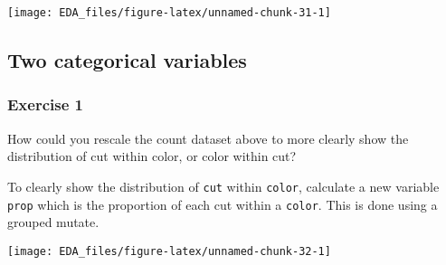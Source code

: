 \documentclass[]{book}
\newenvironment{Shaded}{\begin{snugshade}}{\end{snugshade}}
\newcommand{\CommentTok}[1]{\textcolor[rgb]{0.56,0.35,0.01}{\textit{#1}}}
\newcommand{\DataTypeTok}[1]{\textcolor[rgb]{0.13,0.29,0.53}{#1}}
\newcommand{\DecValTok}[1]{\textcolor[rgb]{0.00,0.00,0.81}{#1}}
\newcommand{\KeywordTok}[1]{\textcolor[rgb]{0.13,0.29,0.53}{\textbf{#1}}}
\newcommand{\NormalTok}[1]{#1}
\newcommand{\OperatorTok}[1]{\textcolor[rgb]{0.81,0.36,0.00}{\textbf{#1}}}
\newcommand{\StringTok}[1]{\textcolor[rgb]{0.31,0.60,0.02}{#1}}
\theoremstyle{plain}
\theoremstyle{remark}
\theoremstyle{definition}
\theoremstyle{definition}
\theoremstyle{definition}
\theoremstyle{remark}
\begin{document}
\begin{center}\texttt{[image: EDA\_files/figure-latex/unnamed-chunk-31-1]} \end{center}

\hypertarget{two-categorical-variables}{%
\subsection{Two categorical variables}\label{two-categorical-variables}}

\hypertarget{exercise-1-16}{%
\subsubsection{Exercise 1}\label{exercise-1-16}}

How could you rescale the count dataset above to more clearly show the
distribution of cut within color, or color within cut?

To clearly show the distribution of \texttt{cut} within \texttt{color},
calculate a new variable \texttt{prop} which is the proportion of each
cut within a \texttt{color}. This is done using a grouped mutate.

\begin{Shaded}
\end{Shaded}

\begin{center}\texttt{[image: EDA\_files/figure-latex/unnamed-chunk-32-1]} \end{center}
\end{document}
